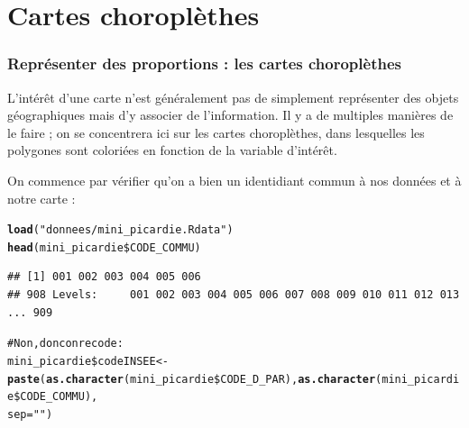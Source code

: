 \documentclass[slidetop, 10pt]{beamer}\usepackage{graphicx, color}
\makeatletter
\newcommand{\hlfunctioncall}[1]{\textcolor[rgb]{0.501960784313725,0,0.329411764705882}{\textbf{#1}}}%
\newcommand{\hlstring}[1]{\textcolor[rgb]{0.6,0.6,1}{#1}}%
\newcommand{\hlcomment}[1]{\textcolor[rgb]{0.180392156862745,0.6,0.341176470588235}{#1}}%
\newenvironment{kframe}{%
 \def\at@end@of@kframe{}%
 \ifinner\ifhmode%
  \def\at@end@of@kframe{\end{minipage}}%
  \begin{minipage}{\columnwidth}%
 \fi\fi%
 \def\FrameCommand##1{\hskip\@totalleftmargin \hskip-\fboxsep
 \colorbox{shadecolor}{##1}\hskip-\fboxsep
     \hskip-\linewidth \hskip-\@totalleftmargin \hskip\columnwidth}%
 \MakeFramed {\advance\hsize-\width
   \@totalleftmargin\z@ \linewidth\hsize
   \@setminipage}}%
 {\par\unskip\endMakeFramed%
 \at@end@of@kframe}
\newenvironment{knitrout}{}{} %
\renewenvironment{knitrout}{\begin{tiny}}{\end{tiny}}
\makeatother
\begin{document}
\section{Cartes choroplèthes}
\begin{frame}[fragile]
\frametitle{Représenter des proportions : les cartes choroplèthes}

L'intérêt d'une carte n'est généralement pas de simplement représenter des objets géographiques mais d'y associer de l'information. Il y a de multiples manières de le faire ; on se concentrera ici sur les cartes choroplèthes, dans lesquelles les polygones sont coloriées en fonction de la variable d'intérêt.

On commence par vérifier qu'on a bien un identidiant commun à nos données et à notre carte :

\begin{knitrout}\tiny
{}\color{fgcolor}\begin{kframe}
\begin{alltt}
\hlfunctioncall{load}(\hlstring{"donnees/mini\_picardie.Rdata"})
\hlfunctioncall{head}(mini\_picardie\$CODE\_COMMU)
\end{alltt}
\begin{verbatim}
## [1] 001 002 003 004 005 006
## 908 Levels:     001 002 003 004 005 006 007 008 009 010 011 012 013 ... 909
\end{verbatim}
\begin{alltt}
\hlcomment{# Non, donc on recode :}
mini\_picardie\$codeINSEE <- \hlfunctioncall{paste}(\hlfunctioncall{as.character}(mini\_picardie\$CODE\_D\_PAR), \hlfunctioncall{as.character}(mini\_picardie\$CODE\_COMMU), 
    sep = \hlstring{""})
\end{alltt}
\end{kframe}
\end{knitrout}


\end{frame}
\end{document}
